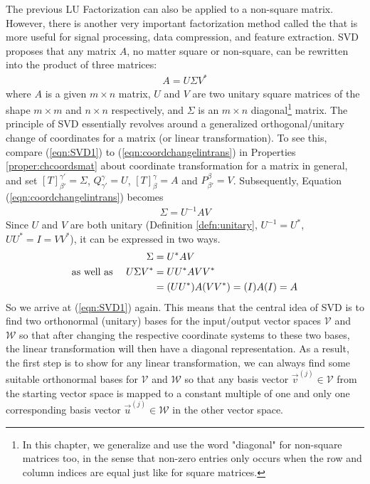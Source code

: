 The previous LU Factorization can also be applied to a non-square matrix. However, there is another very important factorization method called the  that is more useful for signal processing, data compression, and feature extraction. SVD proposes that any matrix $A$, no matter square or non-square, can be rewritten into the product of three matrices:
\begin{align}
A = U\Sigma V^* \label{eqn:SVD1}
\end{align}
where $A$ is a given $m \times n$ matrix, $U$ and $V$ are two unitary square matrices of the shape $m \times m$ and $n \times n$ respectively, and $\Sigma$ is an $m \times n$ diagonal\footnote{In this chapter, we generalize and use the word "diagonal" for non-square matrices too, in the sense that non-zero entries only occurs when the row and column indices are equal just like for square matrices.} matrix. The principle of SVD essentially revolves around a generalized orthogonal/unitary change of coordinates for a matrix (or linear transformation). To see this, compare (\ref{eqn:SVD1}) to (\ref{eqn:coordchangelintrans}) in Properties \ref{proper:chcoordsmat} about coordinate transformation for a matrix in general, and set $[T]^{\gamma'}_{\beta'} = \Sigma$, $Q_{\gamma'}^{\gamma} = U$, $[T]^{\gamma}_{\beta} = A$ and $P_{\beta'}^{\beta} = V$. Subsequently, Equation (\ref{eqn:coordchangelintrans}) becomes
\begin{align}
\Sigma = U^{-1}AV    
\end{align}
Since $U$ and $V$ are both unitary (Definition \ref{defn:unitary}, $U^{-1} = U^*$, $UU^* = I = VV^*$), it can be expressed in two ways.
\begin{align*}
\Sigma &= U^*AV \\
\text{as well as \quad} U\Sigma V^* &= UU^*AVV^* \\
&= (UU^*)A(VV^*) = (I)A(I) = A
\end{align*}
So we arrive at (\ref{eqn:SVD1}) again. This means that the central idea of SVD is to find two orthonormal (unitary) bases for the input/output vector spaces $\mathcal{V}$ and $\mathcal{W}$ so that after changing the respective coordinate systems to these two bases, the linear transformation will then have a diagonal representation. As a result, the first step is to show for any linear transformation, we can always find some suitable orthonormal bases for $\mathcal{V}$ and $\mathcal{W}$ so that any basis vector $\vec{v}^{(j)} \in \mathcal{V}$ from the starting vector space is mapped to a constant multiple of one and only one corresponding basis vector $\vec{u}^{(j)} \in \mathcal{W}$ in the other vector space.

